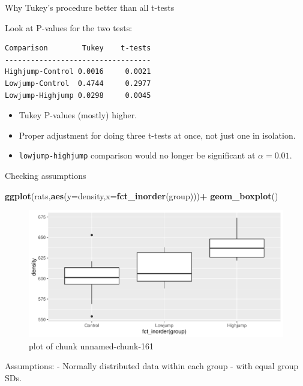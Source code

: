 \documentclass[ignorenonframetext,]{beamer}
\newenvironment{Shaded}{\begin{snugshade}}{\end{snugshade}}
\newcommand{\DataTypeTok}[1]{\textcolor[rgb]{0.13,0.29,0.53}{#1}}
\newcommand{\KeywordTok}[1]{\textcolor[rgb]{0.13,0.29,0.53}{\textbf{#1}}}
\newcommand{\NormalTok}[1]{#1}
\newcommand{\OperatorTok}[1]{\textcolor[rgb]{0.81,0.36,0.00}{\textbf{#1}}}
\providecommand{\tightlist}{%
  \setlength{\itemsep}{0pt}\setlength{\parskip}{0pt}}
\begin{document}
\begin{frame}[fragile]{Why Tukey's procedure better than all t-tests}
\protect\hypertarget{why-tukeys-procedure-better-than-all-t-tests}{}

Look at P-values for the two tests:

\begin{verbatim}
Comparison        Tukey    t-tests
----------------------------------
Highjump-Control 0.0016     0.0021
Lowjump-Control  0.4744     0.2977
Lowjump-Highjump 0.0298     0.0045
\end{verbatim}

\begin{itemize}
\tightlist
\item
  Tukey P-values (mostly) higher.
\item
  Proper adjustment for doing three t-tests at once, not just one in
  isolation.
\item
  \texttt{lowjump-highjump} comparison would no longer be significant at
  \(\alpha = 0.01\).
\end{itemize}

\end{frame}

\begin{frame}[fragile]{Checking assumptions}
\protect\hypertarget{checking-assumptions}{}

\begin{Shaded}
\begin{Highlighting}[]
\KeywordTok{ggplot}\NormalTok{(rats,}\KeywordTok{aes}\NormalTok{(}\DataTypeTok{y=}\NormalTok{density,}\DataTypeTok{x=}\KeywordTok{fct_inorder}\NormalTok{(group)))}\OperatorTok{+}
\KeywordTok{geom_boxplot}\NormalTok{()}
\end{Highlighting}
\end{Shaded}

\begin{figure}
\centering
\includegraphics{figure/unnamed-chunk-161-1.pdf}
\caption{plot of chunk unnamed-chunk-161}
\end{figure}

Assumptions: - Normally distributed data within each group - with equal
group SDs.

\end{frame}
\end{document}
